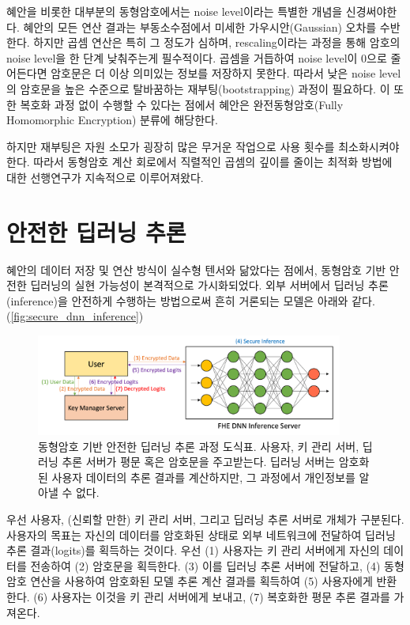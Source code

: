 \documentclass[a4paper, 11pt, chapterprefix=false]{report}
\begin{document}
혜안을 비롯한 대부분의 동형암호에서는 noise level이라는 특별한 개념을
신경써야한다. 혜안의 모든 연산 결과는 부동소수점에서 미세한 가우시안(Gaussian)
오차를 수반한다. 하지만 곱셈 연산은 특히 그 정도가 심하며, rescaling이라는
과정을 통해 암호의 noise level을 한 단계 낮춰주는게 필수적이다. 곱셈을 거듭하여
noise level이 0으로 줄어든다면 암호문은 더 이상 의미있는 정보를 저장하지 못한다.
따라서 낮은 noise level의 암호문을 높은 수준으로 탈바꿈하는
재부팅(bootstrapping) 과정이 필요하다. \cite{bootstrap2018} 이 또한 복호화 과정
없이 수행할 수 있다는 점에서 혜안은 완전동형암호(Fully Homomorphic Encryption)
분류에 해당한다.

하지만 재부팅은 자원 소모가 굉장히 많은 무거운 작업으로 사용 횟수를 최소화시켜야
한다. 따라서 동형암호 계산 회로에서 직렬적인 곱셈의 깊이를 줄이는 최적화 방법에
대한 선행연구가 지속적으로 이루어져왔다.

\section{안전한 딥러닝 추론}

혜안의 데이터 저장 및 연산 방식이 실수형 텐서와 닮았다는 점에서, 동형암호 기반
안전한 딥러닝의 실현 가능성이 본격적으로 가시화되었다. \cite{ml2013} 외부
서버에서 딥러닝 추론(inference)을 안전하게 수행하는 방법으로써 흔히 거론되는
모델은 아래와 같다.  (\autoref{fig:secure_dnn_inference})

\begin{figure}[htbp]
  \centering
  \includegraphics[width=0.9\textwidth]{resource/secure_dnn_inference.png}
  \caption{동형암호 기반 안전한 딥러닝 추론 과정 도식표. 사용자, 키 관리 서버, 딥러닝 추론 서버가 평문 혹은 암호문을 주고받는다. 딥러닝 서버는 암호화된 사용자 데이터의 추론 결과를 계산하지만, 그 과정에서 개인정보를 알아낼 수 없다.}
  \label{fig:secure_dnn_inference}
\end{figure}
우선 사용자, (신뢰할 만한) 키 관리 서버, 그리고 딥러닝 추론 서버로 개체가
구분된다. 사용자의 목표는 자신의 데이터를 암호화된 상태로 외부 네트워크에
전달하여 딥러닝 추론 결과(logits)를 획득하는 것이다. 우선 (1) 사용자는 키 관리
서버에게 자신의 데이터를 전송하여 (2) 암호문을 획득한다. (3) 이를 딥러닝 추론
서버에 전달하고, (4) 동형암호 연산을 사용하여 암호화된 모델 추론 계산 결과를
획득하여 (5) 사용자에게 반환한다. (6) 사용자는 이것을 키 관리 서버에게 보내고,
(7) 복호화한 평문 추론 결과를 가져온다.
\end{document}
